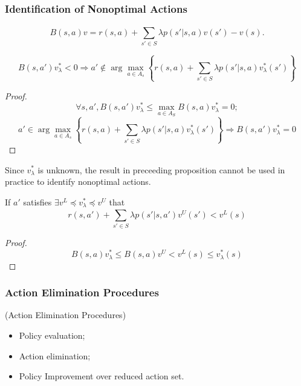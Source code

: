 \subsubsection{Identification of Nonoptimal Actions}%

\[
    B(s,a) v = r(s, a) + \sum^{}_{s' \in S} \lambda p(s' | s, a) v(s') - v(s).
\]

\begin{proposition}
    \[
        B(s, a') v^*_{\lambda} < 0 \Rightarrow a' \notin \arg\max_{a \in A_s} \left\{ r(s,a) + \sum^{}_{s' \in S} \lambda p(s'|s,a) v^{*}_{\lambda}(s') \right\}
    \]
    \begin{proof}
        \[
            \forall s, a', B(s,a') v^*_{\lambda} \le \max_{a \in A_S} B(s,a) v^*_{\lambda} = 0;
        \]
        \[
            a' \in \arg\max_{a \in A_s} \left\{ r(s,a) + \sum^{}_{s' \in S} \lambda p(s'|s,a) v^{*}_{\lambda}(s') \right\}\Rightarrow B(s, a') v^{*}_{\lambda} = 0
        \]
    \end{proof}
\end{proposition}

Since $ v^*_{\lambda} $ is unknown, the result in preceeding proposition cannot be used in practice to identify nonoptimal actions.

\begin{proposition}
    If $ a' $ satisfies $ \exists v^L \preceq v^*_{\lambda} \preceq v^{U} $ that 
    \[
        r(s,a') + \sum^{}_{s' \in S} \lambda p(s' | s, a') v^{U}(s') < v^{L}(s)
    \]
    \begin{proof}
        \[
            B(s,a) v^{*}_\lambda \le B(s,a) v^{U} < v^{L}(s) \le v^{*}_{\lambda}(s)
        \]
    \end{proof}
\end{proposition}

\subsubsection{Action Elimination Procedures}%

\begin{definition}
    (Action Elimination Procedures)
    \begin{itemize}
        \item Policy evaluation;
        \item Action elimination;
        \item Policy Improvement over reduced action set.
    \end{itemize}
\end{definition}

